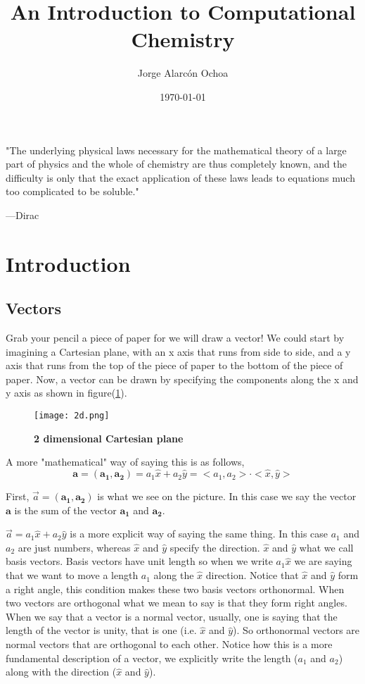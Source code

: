 \documentclass[a4paper]{article}
\title{An Introduction to Computational Chemistry}
\author{Jorge Alarc\'on Ochoa}
\date{\today}
\begin{document}
\maketitle

\epigraph{"The underlying physical laws necessary for the mathematical theory of a large part of physics and the whole of chemistry are thus completely known, and the difficulty is only that the exact application of these laws leads to equations much too complicated to be soluble."}
{ ---\textup{Dirac}}


\section{Introduction}
\subsection{Vectors}
Grab your pencil a piece of paper for we will draw a vector!
We could start by imagining a Cartesian plane, with an x axis that runs from side to side, and a y axis that runs from the top of the piece of paper to the bottom of the piece of paper.
Now, a vector can be drawn by specifying the components along the x and y axis as shown in figure(\ref{2d}).

\begin{figure}
	\begin{center}
	\texttt{[image: 2d.png]} \label{2d}
	\caption{\textbf{2 dimensional Cartesian plane} }
	\end{center}
\end{figure}

A more "mathematical" way of saying this is as follows,
$$
\boldsymbol{a} = \left( \boldsymbol{a_1}, \boldsymbol{a_2} \right) = a_1 \hat{x} + a_2 \hat{y} = < a_1, a_2 > \cdot < \hat{x} , \hat{y} >
$$


First, $\vec{a} = \left( \boldsymbol{a_1}, \boldsymbol{a_2} \right)$ is what we see on the picture. 
In this case we say the vector $\boldsymbol{a}$ is the sum of the vector $\boldsymbol{a_1}$ and $\boldsymbol{a_2}$.

$\vec{a} = a_1 \hat{x} + a_2 \hat{y}$ is a more explicit way of saying the same thing. In this case $a_1$ and $a_2$ are just numbers, whereas $\hat{x}$ and $\hat{y}$ specify the direction.
$\hat{x}$ and $\hat{y}$ what we call basis vectors. 
Basis vectors have unit length so when we write $a_1 \hat{x}$ we are saying that we want to move a length $a_1$ along the $\hat{x}$ direction.
Notice that $\hat{x}$ and $\hat{y}$ form a right angle, this condition makes these two basis vectors orthonormal.
When two vectors are orthogonal what we mean to say is that they form right angles. 
When we say that a vector is a normal vector, usually, one is saying that the length of the vector is unity, that is one (i.e. $\hat{x}$ and $\hat{y}$).
So orthonormal vectors are normal vectors that are orthogonal to each other.
Notice how this is a more fundamental description of a vector, we explicitly write the length ($a_1$ and $a_2$) along with the direction ($\hat{x}$ and $\hat{y}$).
\end{document}
